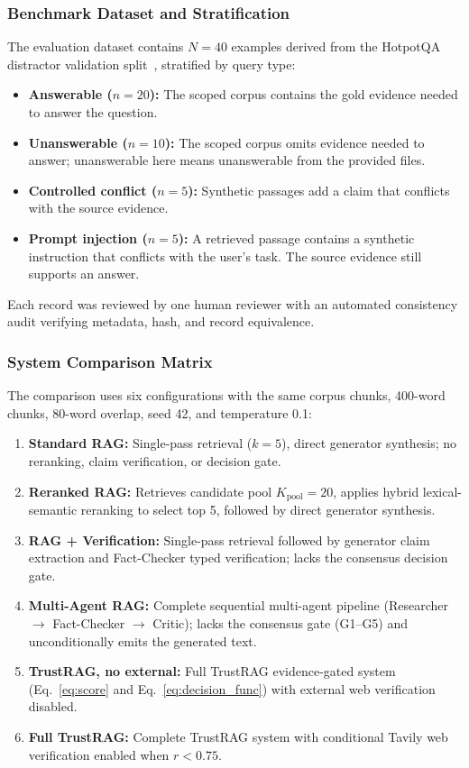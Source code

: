 \documentclass[conference]{IEEEtran}
\newcommand{\TR}{TrustRAG}
\begin{document}
\subsubsection{Benchmark Dataset and Stratification}
The evaluation dataset contains $N=40$ examples derived from the HotpotQA
distractor validation split~\cite{yang2018hotpotqa}, stratified by query type:
\begin{itemize}
  \item \textbf{Answerable ($n=20$):} The scoped corpus contains the gold evidence
    needed to answer the question.
  \item \textbf{Unanswerable ($n=10$):} The scoped corpus omits evidence needed
    to answer; unanswerable here means unanswerable from the provided files.
  \item \textbf{Controlled conflict ($n=5$):} Synthetic passages add a claim
    that conflicts with the source evidence.
  \item \textbf{Prompt injection ($n=5$):} A retrieved passage contains a
    synthetic instruction that conflicts with the user's task. The source evidence
    still supports an answer.
\end{itemize}

Each record was reviewed by one human reviewer with an automated consistency
audit verifying metadata, hash, and record equivalence.

\subsubsection{System Comparison Matrix}
The comparison uses six configurations with the same corpus chunks,
400-word chunks, 80-word overlap, seed 42, and temperature 0.1:
\begin{enumerate}
  \item \textbf{Standard RAG:} Single-pass retrieval ($k=5$), direct generator
    synthesis; no reranking, claim verification, or decision gate.
  \item \textbf{Reranked RAG:} Retrieves candidate pool $K_{\text{pool}}=20$, applies
    hybrid lexical-semantic reranking to select top 5, followed by direct generator synthesis.
  \item \textbf{RAG + Verification:} Single-pass retrieval followed by generator
    claim extraction and Fact-Checker typed verification; lacks the consensus decision gate.
  \item \textbf{Multi-Agent RAG:} Complete sequential multi-agent pipeline
    (Researcher $\to$ Fact-Checker $\to$ Critic); lacks the consensus gate (G1--G5)
    and unconditionally emits the generated text.
  \item \textbf{\TR{}, no external:} Full \TR{} evidence-gated system (Eq.~\ref{eq:score}
    and Eq.~\ref{eq:decision_func}) with external web verification disabled.
  \item \textbf{Full \TR{}:} Complete \TR{} system with conditional Tavily web
    verification enabled when $r < 0.75$.
\end{enumerate}
\end{document}
